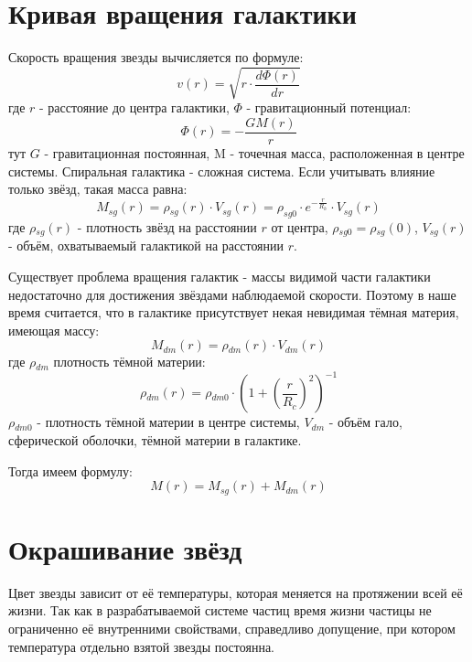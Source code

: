 \section{Кривая вращения галактики}
Скорость вращения звезды вычисляется по формуле:
\begin{equation}
	v(r) = \sqrt{r \cdot{} \frac{d\Phi{}(r)}{dr}}
\end{equation}
где $r$ - расстояние до центра галактики, $\Phi{}$ - гравитационный потенциал:
\begin{equation}
	\Phi{}(r) = -\frac{GM(r)}{r}
\end{equation}
тут $G$ - гравитационная постоянная, M - точечная масса, расположенная в центре системы. Спиральная галактика - сложная система. Если учитывать влияние только звёзд, такая масса равна:
\begin{equation}
	M_{sg}(r) = \rho{}_{sg}(r) \cdot{} V_{sg}(r) = \rho_{sg0} \cdot{} e^{-\frac{r}{R_h}} \cdot{} V_{sg}(r)
\end{equation}
где $\rho{}_{sg}(r)$ - плотность звёзд на расстоянии $r$ от центра, $\rho{}_{sg0} = \rho{}_{sg}(0)$, $V_{sg}(r)$ - объём, охватываемый галактикой на расстоянии $r$.

Существует проблема вращения галактик - массы видимой части галактики недостаточно для достижения звёздами наблюдаемой скорости. Поэтому в наше время считается, что в галактике присутствует некая невидимая тёмная материя, имеющая массу:
\begin{equation}
	M_{dm}(r) = \rho{}_{dm}(r) \cdot{} V_{dm}(r)
\end{equation}
где $\rho{}_{dm}$ плотность тёмной материи:
\begin{equation}
	\rho{}_{dm}(r) = \rho{}_{dm0} \cdot{} (1 + (\frac{r}{R_c})^2)^{-1}
\end{equation}
$\rho{}_{dm0}$ - плотность тёмной материи в центре системы, $V_{dm}$ - объём гало, сферической оболочки, тёмной материи в галактике.

Тогда имеем формулу:
\begin{equation}
	M(r) = M_{sg}(r) + M_{dm}(r)
\end{equation}

\section{Окрашивание звёзд}
Цвет звезды зависит от её температуры, которая меняется на протяжении всей её жизни. Так как в разрабатываемой системе частиц время жизни частицы не ограниченно её внутренними свойствами, справедливо допущение, при котором температура отдельно взятой звезды постоянна.

